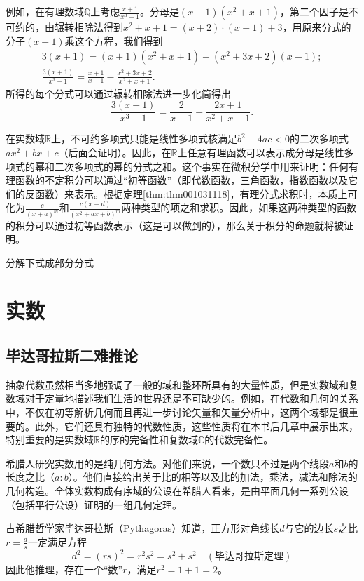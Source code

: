 例如，在有理数域$\mathbb{Q}$上考虑$\frac{x+1}{x^3-1}$。分母是$(x-1)(x^2+x+1)$，第二个因子是不可约的，由辗转相除法得到$x^2+x+1 = (x+2) \cdot (x-1) + 3$，用原来分式的分子$(x+1)$乘这个方程，我们得到
\begin{gather*}
3(x+1) = (x+1)(x^2+x+1)- (x^2 + 3x + 2)(x-1);\\
\frac{3(x+1)}{x^3-1} = \frac{x+1}{x-1} - \frac{x^2+3x+2}{x^2+x+1}.
\end{gather*}
所得的每个分式可以通过辗转相除法进一步化简得出
\[
\frac{3(x+1)}{x^3-1} = \frac{2}{x-1} - \frac{2x+1}{x^2+x+1}.
\]

在实数域$\mathbb{R}$上，不可约多项式只能是线性多项式核满足$b^2-4ac<0$的二次多项式$ax^2+bx+c$（后面会证明）。因此，在$\mathbb{R}$上任意有理函数可以表示成分母是线性多项式的幂和二次多项式的幂的分式之和。这个事实在微积分学中用来证明：任何有理函数的不定积分可以通过“初等函数”（即代数函数，三角函数，指数函数以及它们的反函数）来表示。根据定理\ref{thm:thm001031118}，有理分式求积时，本质上可化为$\frac{c}{(x+a)^m}$和$\frac{c(x+d)}{(x^2+ax+b)^m}$两种类型的项之和求积。因此，如果这两种类型的函数的积分可以通过初等函数表示（这是可以做到的），那么关于积分的命题就将被证明。

\begin{problem}
分解下式成部分分式
\end{problem}


\section{实数}\label{section00104}

\subsection{毕达哥拉斯二难推论}\label{subsection0010401}
抽象代数虽然相当多地强调了一般的域和整环所具有的大量性质，但是实数域和复数域对于定量地描述我们生活的世界还是不可缺少的。例如，在代数和几何的关系中，不仅在初等解析几何而且再进一步讨论矢量和矢量分析中，这两个域都是很重要的。此外，它们还具有独特的代数性质，这些性质将在本书后几章中展示出来，特别重要的是实数域$\mathbb{R}$的序的完备性和复数域$\mathbb{C}$的代数完备性。

希腊人研究实数用的是纯几何方法。对他们来说，一个数只不过是两个线段$a$和$b$的长度之比（$a:b$）。他们直接给出关于比的相等以及比的加法，乘法，减法和除法的几何构造。全体实数构成有序域的公设在希腊人看来，是由平面几何一系列公设（包括平行公设）证明的一组几何定理。

古希腊哲学家毕达哥拉斯（Pythagoras）知道，正方形对角线长$d$与它的边长$s$之比$r = \frac{d}{s}$一定满足方程
\begin{equation}\label{equ001040101}
d^2 = (rs)^2 = r^2s^2 = s^2 + s^2 \quad (\text{毕达哥拉斯定理})
\end{equation}
因此他推理，存在一个“数”$r$，满足$r^2 = 1 + 1 = 2$。

